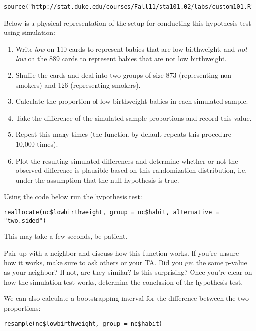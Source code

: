 \documentclass[11pt]{article}
\begin{document}
\begin{lstlisting}
source("http://stat.duke.edu/courses/Fall11/sta101.02/labs/custom101.R")
\end{lstlisting}

Below is a physical representation of the setup for conducting this hypothesis test using simulation:
\begin{enumerate}
\item Write \textit{low} on 110 cards to represent babies that are low birthweight, and \textit{not low} on the 889 cards to represent babies that are not low birthweight.
\item Shuffle the cards and deal into two groups of size 873 (representing non-smokers) and 126 (representing smokers).
\item Calculate the proportion of low birthweight babies in each simulated sample.
\item Take the difference of the simulated sample proportions and record this value.
\item Repeat this many times (the function  by default repeats this procedure 10,000 times).
\item Plot the resulting simulated differences and determine whether or not the observed difference is plausible based on this randomization distribution, i.e. under the assumption that the null hypothesis is true.
\end{enumerate}

Using the code below run the hypothesis test:

\begin{lstlisting}
reallocate(nc$lowbirthweight, group = nc$habit, alternative = "two.sided")
\end{lstlisting}

This may take a few seconds, be patient.

\begin{exercise}
Pair up with a neighbor and discuss how this function works. If you're unsure how it works, make sure to ask others or your TA. Did you get the same p-value as your neighbor? If not, are they similar? Is this surprising? Once you're clear on how the simulation test works, determine the conclusion of the hypothesis test.
\end{exercise}

We can also calculate a bootstrapping interval for the difference between the two proportions:

\begin{lstlisting}
resample(nc$lowbirthweight, group = nc$habit)
\end{lstlisting}
\end{document}
